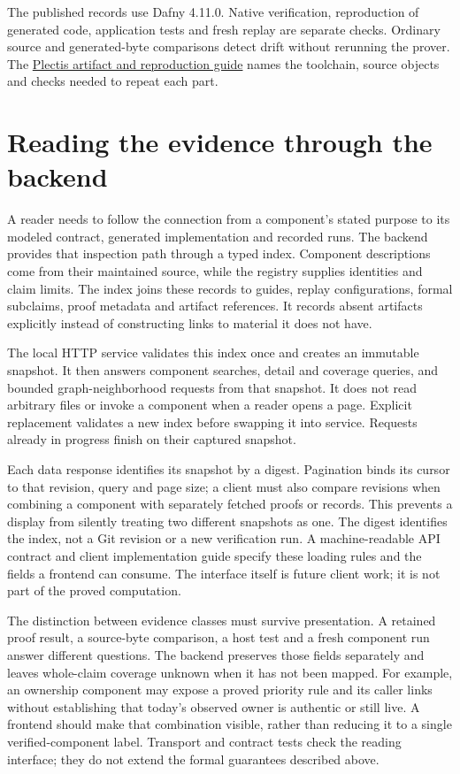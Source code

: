 \documentclass[11pt]{article}
\newcommand{\repourl}{https://github.com/wcook04/plectis}
\newcommand{\artifactguide}{\href{\repourl/blob/main/paper/README.md}{Plectis artifact and reproduction guide}}
\begin{document}
The published records use Dafny 4.11.0. Native verification, reproduction of
generated code, application tests and fresh replay are separate checks. Ordinary
source and generated-byte comparisons detect drift without rerunning the
prover. The \artifactguide{} names the toolchain, source objects and checks
needed to repeat each part.

\section{Reading the evidence through the backend}
\label{sec:inspection}
A reader needs to follow the connection from a component's stated purpose to
its modeled contract, generated implementation and recorded runs. The backend
provides that inspection path through a typed index. Component descriptions
come from their maintained source, while the registry supplies identities and
claim limits. The index joins these records to guides, replay configurations,
formal subclaims, proof metadata and artifact references. It records absent
artifacts explicitly instead of constructing links to material it does not have.

The local HTTP service validates this index once and creates an immutable
snapshot. It then answers component searches, detail and coverage queries, and
bounded graph-neighborhood requests from that snapshot. It does not read
arbitrary files or invoke a component when a reader opens a page. Explicit
replacement validates a new index before swapping it into service. Requests
already in progress finish on their captured snapshot.

Each data response identifies its snapshot by a digest. Pagination binds its
cursor to that revision, query and page size; a client must also compare
revisions when combining a component with separately fetched proofs or records.
This prevents a display from silently treating two different snapshots as one.
The digest identifies the index, not a Git revision or a new verification run.
A machine-readable API contract and client implementation guide specify these
loading rules and the fields a frontend can consume. The interface itself is
future client work; it is not part of the proved computation.

The distinction between evidence classes must survive presentation. A retained
proof result, a source-byte comparison, a host test and a fresh component run
answer different questions. The backend preserves those fields separately and
leaves whole-claim coverage unknown when it has not been mapped. For example,
an ownership component may expose a proved priority rule and its caller links
without establishing that today's observed owner is authentic or still live.
A frontend should make that combination visible, rather than reducing it to a
single verified-component label. Transport and contract tests check the reading
interface; they do not extend the formal guarantees described above.
\end{document}
